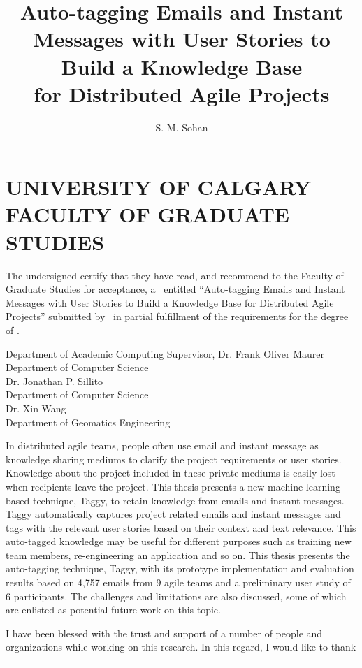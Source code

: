\documentclass{ucalgthes1}
\title{Auto-tagging Emails and Instant Messages with User Stories to Build a Knowledge Base\\ 
\bigskip for Distributed Agile Projects}
\author{S. M. Sohan}
\newcommand{\thesistitle}{Auto-tagging Emails and Instant Messages with User Stories to Build a Knowledge Base for Distributed Agile Projects}
\begin{document}
\makethesistitle
{}     %
\setcounter{page}{1}
\chapter*{UNIVERSITY OF CALGARY \\ FACULTY OF GRADUATE STUDIES}
\thispagestyle{empty}
The undersigned certify that they have read, and recommend
to the Faculty of Graduate Studies for acceptance, a \Thesis\ entitled
``\thesistitle'' submitted by \Author\
in partial fulfillment of the requirements for the degree of
\Degree.\\

%
%
\begin{signing}{Department of Academic Computing}
\signline
Supervisor, Dr. Frank Oliver Maurer \\
Department of Computer Science \\
\signline
Dr. Jonathan P. Sillito\\
Department of Computer Science \\
\signline
Dr. Xin Wang \\
Department of Geomatics Engineering \\
\end{signing}
%
\newpage
{}
{} 
In distributed agile teams, people often use email and instant message as knowledge sharing mediums to clarify the project requirements or user stories. Knowledge about the project included in these private mediums is easily lost when recipients leave the project. This thesis presents a new machine learning based technique, Taggy, to retain knowledge from emails and instant messages. Taggy automatically captures project related emails and instant messages and tags with the relevant user stories based on their context and text relevance. This auto-tagged knowledge may be useful for different purposes such as training new team members, re-engineering an application and so on. This thesis presents the auto-tagging technique, Taggy, with its prototype implementation and evaluation results based on 4,757 emails from 9 agile teams and a preliminary user study of 6 participants. The challenges and limitations are also discussed, some of which are enlisted as potential future work on this topic.
\newpage

{}
I have been blessed with the trust and support of a number of people and organizations while working on this research. In this regard, I would like to thank -
\end{document}
